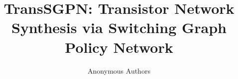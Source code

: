 \documentclass[letterpaper]{article}
\theoremstyle{plain}
\theoremstyle{definition}
\newcommand{\method}{TransSGPN}
\begin{document}
\title{\method: Transistor Network Synthesis via
       Switching Graph Policy Network}

\author{
  Anonymous Authors
}

\maketitle











\end{document}
